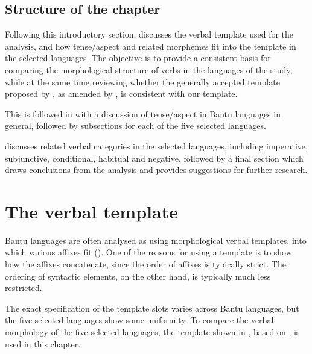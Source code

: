 \documentclass[output=paper,
            colorlinks, citecolor=brown
            ,draftmode
		  ]{langscibook}
\begin{document}
\subsection{Structure of the chapter}\label{sec:petzell:1.3}

Following this introductory section,  discusses the verbal template used for the analysis, and how tense/aspect and related morphemes fit into the template in the selected languages. The objective is to provide a consistent basis for comparing the morphological structure of verbs in the languages of the study, while at the same time reviewing whether the generally accepted template proposed by \citet{Meeussen1967}, as amended by \citet{Nurse2008}, is consistent with our template.



This is followed in  with a discussion of tense/aspect in Bantu languages in general, followed by subsections for each of the five selected languages.



 discusses related verbal categories in the selected languages, including imperative, subjunctive, conditional, habitual and negative, followed by a final section which draws conclusions from the analysis and provides suggestions for further research.


\section{The verbal template}\label{sec:petzell:2}
\largerpage
Bantu languages are often analysed as using morphological verbal templates, into which various affixes fit (\citealt{Meeussen1967, Nurse2008}). One of the reasons for using a template is to show how the affixes concatenate, since the order of affixes is typically strict. The ordering of syntactic elements, on the other hand, is typically much less restricted.



The exact specification of the template slots varies across Bantu languages, but the five selected languages show some uniformity. To compare the verbal morphology of the five selected languages, the template shown in , based on \citet[108--111]{Meeussen1967}, is used in this chapter.
\end{document}
